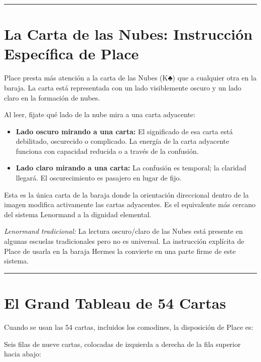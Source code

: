 \begin{center}\rule{0.5\linewidth}{0.5pt}\end{center}

\section{La Carta de las Nubes: Instrucción Específica de Place}\label{the-clouds-card-places-specific-instruction}

Place presta más atención a la carta de las Nubes (K♣) que a cualquier otra en la baraja. La carta está representada con un lado visiblemente oscuro y un lado claro en la formación de nubes.

Al leer, fijate qué lado de la nube mira a una carta adyacente:

\begin{itemize}
\tightlist
\item
  \textbf{Lado oscuro mirando a una carta:} El significado de esa carta está debilitado, oscurecido o complicado. La energía de la carta adyacente funciona con capacidad reducida o a través de la confusión.
\item
  \textbf{Lado claro mirando a una carta:} La confusión es temporal; la claridad llegará. El oscurecimiento es pasajero en lugar de fijo.
\end{itemize}

Esta es la única carta de la baraja donde la orientación direccional dentro de la imagen modifica activamente las cartas adyacentes. Es el equivalente más cercano del sistema Lenormand a la dignidad elemental.

\emph{Lenormand tradicional:} La lectura oscuro/claro de las Nubes está presente en algunas escuelas tradicionales pero no es universal. La instrucción explícita de Place de usarla en la baraja Hermes la convierte en una parte firme de este sistema.

\begin{center}\rule{0.5\linewidth}{0.5pt}\end{center}

\section{El Grand Tableau de 54 Cartas}\label{the-54-card-grand-tableau}

Cuando se usan las 54 cartas, incluidos los comodines, la disposición de Place es:

Seis filas de nueve cartas, colocadas de izquierda a derecha de la fila superior hacia abajo:


